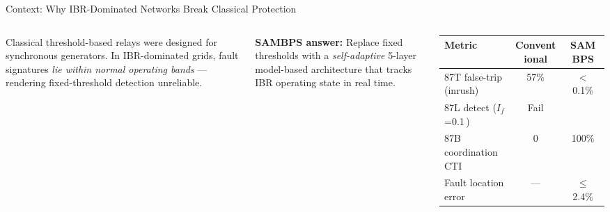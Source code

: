 \documentclass[aspectratio=169, 10pt]{beamer}
\newcommand{\pu}{\,\text{p.u.}}
\newcommand{\cmark}{\textcolor{thesisgreen}{\ding{51}}}
\begin{document}
\begin{frame}{Context: Why IBR-Dominated Networks Break Classical Protection}
\begin{columns}[T]
\vspace{6pt}
\begin{tcolorbox}[warnbox, title={The Core Problem}]
{\small Classical threshold-based relays were designed for synchronous generators.
In IBR-dominated grids, fault signatures \emph{lie within normal operating bands}
--- rendering fixed-threshold detection unreliable.}
\end{tcolorbox}
\vspace{6pt}
\begin{tcolorbox}[keybox]
{\small\textbf{SAMBPS answer:} Replace fixed thresholds with a
\emph{self-adaptive} 5-layer model-based architecture that
tracks IBR operating state in real time.}
\end{tcolorbox}
\vspace{8pt}
{\footnotesize
\begin{tabular}{lcc}
\toprule
\textbf{Metric} & \textbf{Conventional} & \textbf{SAMBPS}\\
\midrule
87T false-trip (inrush) & 57\% & $<$0.1\%\\
87L detect ($I_f$=0.1\pu) & Fail & \cmark\\
87B coordination CTI    & 0    & 100\%\\
Fault location error     & ---  & $\le$2.4\%\\
\bottomrule
\end{tabular}}
\end{columns}
\end{frame}
\end{document}
